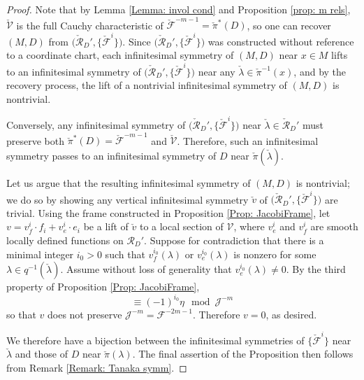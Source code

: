 \documentclass[11pt,letterpaper]{amsart}
\numberwithin{equation}{section}
\begin{document}
\begin{proof}
    Note that by Lemma \ref{Lemma: invol cond} and Proposition \ref{prop: m rels}, $\check {\mathcal{V}}$ is the full Cauchy characteristic of $\check{\mathcal{F}}^{-m-1}=\check\pi^*(D)$, so one can recover $(M,D)$ from \linebreak[4] $\big(\check{\mathcal{R}}_D',\{\check{\mathcal{F}}^i\}\big)$.
    Since $\big(\check{\mathcal{R}}_D',\{\check{\mathcal{F}}^i\}\big)$ was constructed without reference to a coordinate chart, each infinitesimal symmetry of $(M,D)$ near $x\in M$ lifts to an infinitesimal symmetry of $\big({\check{\mathcal{R}}}_D',\{\check{\mathcal{F}}^i\}\big)$ near any $\check\lambda\in \check\pi^{-1}(x)$, and by the recovery process, the lift of a nontrivial infinitesimal symmetry of $(M,D)$ is nontrivial.
    
    Conversely, any infinitesimal symmetry of $\big(\check{\mathcal{R}}_D',\{\check{\mathcal{F}}^i\}\big)$ near $\check\lambda\in\check{\mathcal{R}}_D'$ must preserve both $\check \pi^*(D) = \check{\mathcal{F}}^{-m-1}$ and $\check {\mathcal{V}}$. Therefore, such an infinitesimal symmetry passes to an infinitesimal symmetry of $D$ near $\check\pi(\check\lambda)$.
    
    Let us argue that the resulting infinitesimal symmetry of $(M,D)$ is nontrivial; we do so by showing any vertical infinitesimal symmetry $\check v$ of \allowbreak$\big({\check{\mathcal{R}}}_D',\{\check{\mathcal{F}}^i\}\big)$ are trivial. Using the frame constructed in Proposition \ref{Prop: JacobiFrame}, let $v = v_f^i \cdot f_i + v_e^i \cdot e_i$ be a lift of $\check v$ to a local section of $\mathcal V$, where $v_e^i$ and $v_f^i$ are smooth locally defined functions on $\mathcal R_D'$. Suppose for contradiction that there is a minimal integer $i_0>0$ such that $v_f^{i_0}(\lambda)$ or $v_e^{i_0}(\lambda)$ is nonzero for some $\lambda \in q^{-1}(\check\lambda)$. Assume without loss of generality that $v_e^{i_0}(\lambda)\neq 0$. By the third property of Proposition \ref{Prop: JacobiFrame},
    \begin{equation}
        [v,f_{-i_0}]\equiv (-1)^{i_0}\eta\mod \mathcal{J}^{-m}
    \end{equation}
    so that $v$ does not preserve $\mathcal{J}^{-m} = \mathcal F^{-2m-1}$. Therefore $v=0$, as desired.

    We therefore have a bijection between the infinitesimal symmetries of $\{\check{\mathcal F}^i\}$ near $\check\lambda$ and those of $D$ near $\check \pi(\lambda)$. The final assertion of the Proposition then follows from Remark \ref{Remark: Tanaka symm}.
\end{proof}
\end{document}

